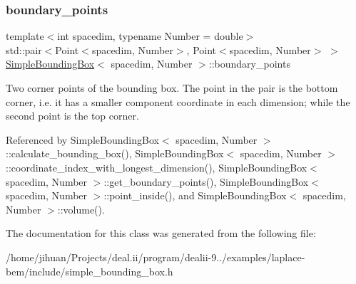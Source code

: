 \subsubsection{\texorpdfstring{boundary\+\_\+points}{boundary\_points}}
{\footnotesize\ttfamily template$<$int spacedim, typename Number = double$>$ \\
std\+::pair$<$Point$<$spacedim, Number$>$, Point$<$spacedim, Number$>$ $>$ \hyperlink{classSimpleBoundingBox}{Simple\+Bounding\+Box}$<$ spacedim, Number $>$\+::boundary\+\_\+points\hspace{0.3cm}{\ttfamily [private]}}

Two corner points of the bounding box. The point in the pair is the bottom corner, i.\+e. it has a smaller component coordinate in each dimension; while the second point is the top corner. 

Referenced by Simple\+Bounding\+Box$<$ spacedim, Number $>$\+::calculate\+\_\+bounding\+\_\+box(), Simple\+Bounding\+Box$<$ spacedim, Number $>$\+::coordinate\+\_\+index\+\_\+with\+\_\+longest\+\_\+dimension(), Simple\+Bounding\+Box$<$ spacedim, Number $>$\+::get\+\_\+boundary\+\_\+points(), Simple\+Bounding\+Box$<$ spacedim, Number $>$\+::point\+\_\+inside(), and Simple\+Bounding\+Box$<$ spacedim, Number $>$\+::volume().



The documentation for this class was generated from the following file\+:\begin{DoxyCompactItemize}
\item 
/home/jihuan/\+Projects/deal.\+ii/program/dealii-\/9../examples/laplace-\/bem/include/simple\+\_\+bounding\+\_\+box.\+h\end{DoxyCompactItemize}
